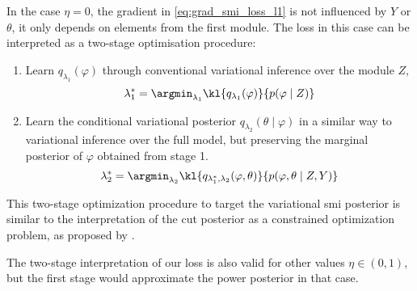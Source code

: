 In the case $\eta=0$, the gradient in \cref{eq:grad_smi_loss_l1} is not influenced by $Y$ or $\theta$, it only depends on elements from the first module.
The loss in this case can be interpreted as a two-stage optimisation procedure:

\begin{enumerate}
  \item Learn $q_{\lambda_1}(\varphi)$ through conventional variational inference over the module $Z$,
        \begin{equation*}
          \lambda_1^* = \argmin_{\lambda_1} \kl{ q_{\lambda_1}(\varphi) }{ p(\varphi \mid Z) }
        \end{equation*}
  \item Learn the conditional variational posterior $q_{\lambda_2}(\theta \mid \varphi)$ in a similar way to variational inference over the full model, but preserving the marginal posterior of $\varphi$ obtained from stage 1.
        \begin{equation*}
          \lambda_2^* = \argmin_{\lambda_2} \kl{ q_{\lambda_1^*,\lambda_2}(\varphi,\theta) }{ p(\varphi,\theta \mid Z, Y) }
        \end{equation*}
\end{enumerate}

This two-stage optimization procedure to target the variational \acrshort*{smi} posterior is similar to the interpretation of the cut posterior as a constrained optimization problem, as proposed by \cite{Yu2021variationalcut}.

The two-stage interpretation of our loss is also valid for other values $\eta \in (0,1)$, but the first stage would approximate the power posterior in that case.
